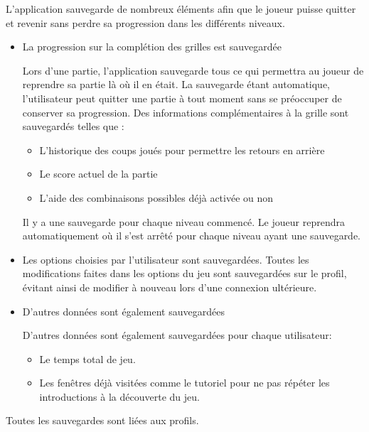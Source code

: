 {
    L'application sauvegarde de nombreux éléments afin que le joueur puisse quitter et revenir sans perdre sa progression dans les différents niveaux.
    \begin{itemize}
        \item {}
            {La progression sur la complétion des grilles est sauvegardée}
            {
                Lors d'une partie, l'application sauvegarde tous ce qui permettra au joueur de reprendre sa partie là où il en était. La sauvegarde étant automatique, l'utilisateur peut quitter une partie à tout moment sans se préoccuper de conserver sa progression. Des informations complémentaires à la grille sont sauvegardés telles que :
                \noexpand\begin{itemize}
                    \noexpand\item L'historique des coups joués pour permettre les retours en arrière
                    \noexpand\item Le score actuel de la partie
                    \noexpand\item L'aide des combinaisons possibles déjà activée ou non
                \noexpand\end{itemize}
                Il y a une sauvegarde pour chaque niveau commencé.
                Le joueur reprendra automatiquement où il s'est arrêté pour chaque niveau ayant une sauvegarde.
            }
        \item {}
            {Les options choisies par l'utilisateur sont sauvegardées.}
            {
                Toutes les modifications faites dans les options du jeu sont sauvegardées sur le profil, évitant ainsi de modifier à nouveau lors d'une connexion ultérieure.
            }
        \item {}
            {D'autres données sont également sauvegardées}
            {
                D'autres données sont également sauvegardées pour chaque utilisateur:
                \noexpand\begin{itemize}
                    \noexpand\item Le temps total de jeu.
                    \noexpand\item Les fenêtres déjà visitées comme le tutoriel pour ne pas répéter les introductions à la découverte du jeu.
                \noexpand\end{itemize}
            }
    \end{itemize}
    Toutes les sauvegardes sont liées aux profils.

}
